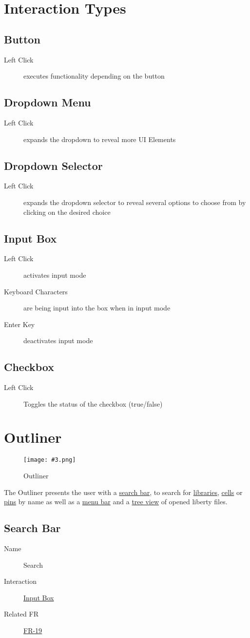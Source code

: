 \documentclass[10pt,a4paper]{report}
\newcommand{\refer}[2]{\hyperref[#1]{\textcolor{col:reference}{#2}}}
\newcommand{\h}[1]{\textcolor{col:highlight}{#1}}
\newcommand{\defit}[3]{\subsection{#2}\label{it:#1}#3}
\newcommand{\ui}[3]{
    \begin{description}
        \item[Name]{#1}
        \item[Interaction]{#2}
        \item[Related FR]{#3}
    \end{description}
}
\newcommand{\refg}[2]{\refer{glo:#1}{#2}}
\newcommand{\includeimage}[5]{
    \begin{figure}[H]
        #1
        \texttt{[image: \#3.png]}
        \caption{#4}
        \label{fig:#5}
    \end{figure}
}
\begin{document}
\section{Interaction Types}
\defit{button}{Button}{
    \begin{description}
        \item[Left Click]{executes functionality depending on the button}
    \end{description}
}
\defit{dropdown_menu}{Dropdown Menu}{
    \begin{description}
            \item[Left Click]{expands the dropdown to reveal more UI Elements}
    \end{description}
}
\defit{dropdown_selector}{Dropdown Selector}{
    \begin{description}
            \item[Left Click]{expands the dropdown selector to reveal several options to choose from by clicking on the desired choice}
    \end{description}
}
\defit{input_box}{Input Box}{
    \begin{description}
        \item[Left Click]{activates \h{input mode}}
        \item[Keyboard Characters]{are being input into the box when in \h{input mode}}
        \item[Enter Key]{deactivates \h{input mode}}
    \end{description}
}
\defit{checkbox}{Checkbox}{
    \begin{description}
        \item[Left Click]{Toggles the status of the checkbox (true/false)}
    \end{description}
}

\section{Outliner}
\label{sec:outliner}
\includeimage{}{0.3}{Outliner}{Outliner}{outliner}
The \h{Outliner} presents the user with a \refer{sec:outliner:search}{search bar}, to search for \refg{library}{libraries}, \refg{cell}{cells} or \refg{pin}{pins} by name as well as a \refer{sec:outliner:menu}{menu bar} and a \refer{sec:outliner:Outliner}{tree view} of opened liberty files.

\subsection{Search Bar}
\label{sec:outliner:search}
\ui{Search}{\refer{it:input_box}{Input Box}}{\refer{FR-19}{FR-19}}
\end{document}
